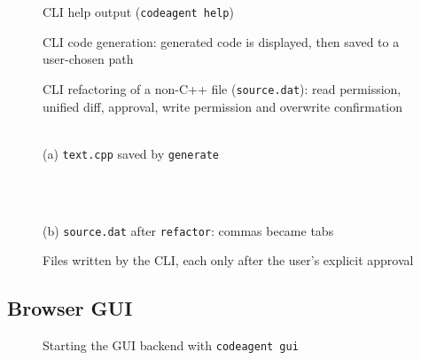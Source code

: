 \documentclass[12pt,a4paper,oneside]{book}
\begin{document}
\begin{figure}[htbp]
\centering
{}
\caption{CLI help output (\texttt{codeagent help})}
\label{fig:ca-cli-help}
\end{figure}

\begin{figure}[htbp]
\centering
{}
\caption{CLI code generation: generated code is displayed, then saved to a user-chosen path}
\label{fig:ca-cli-generate}
\end{figure}

\begin{figure}[htbp]
\centering
{}
\caption{CLI refactoring of a non-C++ file (\texttt{source.dat}): read permission, unified diff, approval, write permission and overwrite confirmation}
\label{fig:ca-cli-refactor}
\end{figure}

\begin{figure}[htbp]
\centering
\begin{minipage}[t]{\linewidth}\centering
{}\\[2pt]
\small (a) \texttt{text.cpp} saved by \texttt{generate}
\end{minipage}\\[10pt]
\begin{minipage}[t]{\linewidth}\centering
{}\\[2pt]
\small (b) \texttt{source.dat} after \texttt{refactor}: commas became tabs
\end{minipage}
\caption{Files written by the CLI, each only after the user's explicit approval}
\label{fig:ca-cli-files}
\end{figure}

\clearpage
\subsection{Browser GUI}

\begin{figure}[htbp]
\centering
{}
\caption{Starting the GUI backend with \texttt{codeagent gui}}
\label{fig:ca-gui-start}
\end{figure}
\end{document}
